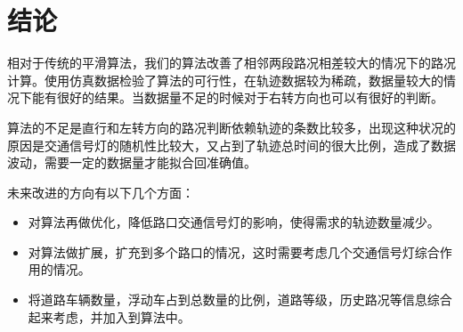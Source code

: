 \chapter{结论}
\label{chap5}

相对于传统的平滑算法，我们的算法改善了相邻两段路况相差较大的情况下的路况计算。使用仿真数据检验了算法的可行性，在轨迹数据较为稀疏，数据量较大的情况下能有很好的结果。当数据量不足的时候对于右转方向也可以有很好的判断。

算法的不足是直行和左转方向的路况判断依赖轨迹的条数比较多，出现这种状况的原因是交通信号灯的随机性比较大，又占到了轨迹总时间的很大比例，造成了数据波动，需要一定的数据量才能拟合回准确值。

未来改进的方向有以下几个方面：
\begin{itemize}
\item 对算法再做优化，降低路口交通信号灯的影响，使得需求的轨迹数量减少。
\item 对算法做扩展，扩充到多个路口的情况，这时需要考虑几个交通信号灯综合作用的情况。
\item 将道路车辆数量，浮动车占到总数量的比例，道路等级，历史路况等信息综合起来考虑，并加入到算法中。
\end{itemize}
